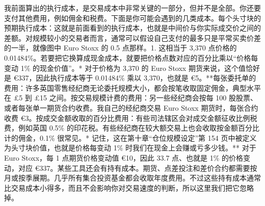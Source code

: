 \begin{chineseblock}我前面算出的执行成本，是交易成本中非常关键的一部分，但并不是全部。你还要支付其他费用，例如佣金和税费。下面是你可能会遇到的几类成本。每个头寸块的预期执行成本：这就是前面看到的执行成本，也就是中间价与你实际成交价之间的差额。对规模较小的交易者而言，通常可以假设自己支付的最多只是平常买卖价差的一半，就像图中 Euro Stoxx 的 0.5 点那样。1. 这相当于 3,370 点价格的 0.01484\%。若要把它换算成现金成本，就要把价格点数对应的百分比乘以“价格每变动 1\% 的现金价值”。* 对于价格为 3,370 的 Euro Stoxx 期货来说，这个值恰好是 €337，因此执行成本等于 0.01484\% 乘以 3,370，也就是 €5。**每张委托单的费用：许多英国零售经纪商无论委托规模大小，都会按笔收取固定佣金，典型水平在 £5 到 £15 之间。按交易规模计费的费用：另一些经纪商会按每 100 股股票、或者每张单一期货合约收费。我自己的经纪商交易 Euro Stoxx 期货时，每张合约收费 €3。按成交金额收取的百分比费用：有些司法辖区会对成交金额征收比例税费，例如英国 0.5\% 的印花税。有些经纪商在较大额交易上也会收取按金额百分比计的佣金，0.1\% 很常见。* 记住，这在第十章“仓位规模设定”第 154 页中被定义为头寸块价值，也就是价格每变动 1\% 时我们在现金上会赚或亏多少钱。** 对于 Euro Stoxx，每 1 点期货价格变动值 €10，因此 33.7 点、也就是 1\% 的价格变动，对应 €337。某些工具还会有持有成本。期货、点差投注和差价合约都需要按月或按季展期。几乎所有集合投资基金都会收取年度费用。不过这些持有成本通常比交易成本小得多，而且不会影响你对交易速度的判断，所以这里我们把它忽略掉。\end{chineseblock}


